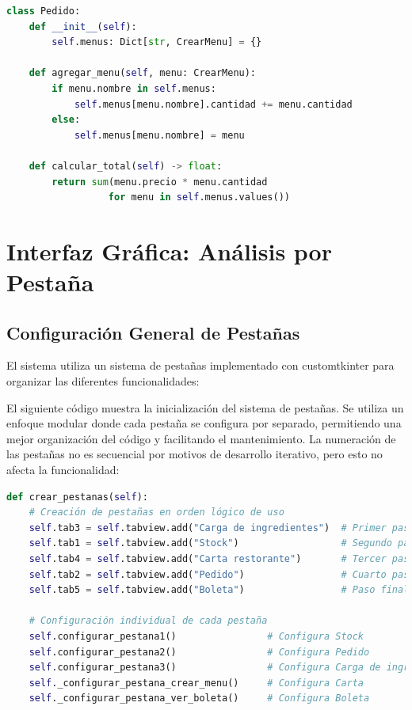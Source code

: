 \documentclass[12pt,letterpaper]{article}
\begin{document}
\begin{lstlisting}[language=Python, caption=Implementación de Pedido]
class Pedido:
    def __init__(self):
        self.menus: Dict[str, CrearMenu] = {}
    
    def agregar_menu(self, menu: CrearMenu):
        if menu.nombre in self.menus:
            self.menus[menu.nombre].cantidad += menu.cantidad
        else:
            self.menus[menu.nombre] = menu
    
    def calcular_total(self) -> float:
        return sum(menu.precio * menu.cantidad 
                  for menu in self.menus.values())
\end{lstlisting}

\section{Interfaz Gráfica: Análisis por Pestaña}

\subsection{Configuración General de Pestañas}
El sistema utiliza un sistema de pestañas implementado con customtkinter para organizar las diferentes funcionalidades:

El siguiente código muestra la inicialización del sistema de pestañas. Se utiliza un enfoque modular donde cada pestaña se configura por separado, permitiendo una mejor organización del código y facilitando el mantenimiento. La numeración de las pestañas no es secuencial por motivos de desarrollo iterativo, pero esto no afecta la funcionalidad:

\begin{lstlisting}[language=Python, caption=Configuración de Pestañas]
def crear_pestanas(self):
    # Creación de pestañas en orden lógico de uso
    self.tab3 = self.tabview.add("Carga de ingredientes")  # Primer paso: cargar ingredientes
    self.tab1 = self.tabview.add("Stock")                  # Segundo paso: verificar stock
    self.tab4 = self.tabview.add("Carta restorante")       # Tercer paso: ver carta
    self.tab2 = self.tabview.add("Pedido")                 # Cuarto paso: hacer pedido
    self.tab5 = self.tabview.add("Boleta")                 # Paso final: generar boleta
    
    # Configuración individual de cada pestaña
    self.configurar_pestana1()                # Configura Stock
    self.configurar_pestana2()                # Configura Pedido
    self.configurar_pestana3()                # Configura Carga de ingredientes
    self._configurar_pestana_crear_menu()     # Configura Carta
    self._configurar_pestana_ver_boleta()     # Configura Boleta
\end{lstlisting}
\end{document}
